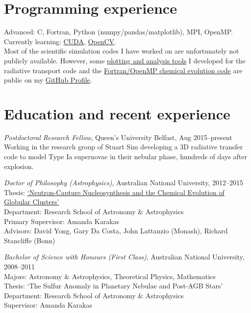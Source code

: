 \documentclass[11pt]{res} %
\begin{document}
\begin{resume}
\section{Programming experience}
  Advanced: C, Fortran, Python (numpy/pandas/matplotlib), MPI, OpenMP.\\
  Currently learning: \href{https://github.com/lukeshingles/cuda-examples}{CUDA}, \href{https://github.com/lukeshingles/opencv-examples}{OpenCV}.\\
  Most of the scientific simulation codes I have worked on are unfortunately not publicly available. However, some \href{https://github.com/lukeshingles/artistools}{plotting and analysis tools} I developed for the radiative transport code and the \href{https://github.com/lukeshingles/evelchemevol}{Fortran/OpenMP chemical evolution code} are public on my \href{https://github.com/lukeshingles}{GitHub Profile}.

\section{Education and recent experience}
  {\it Postdoctoral Research Fellow}, Queen's University Belfast, Aug 2015--present\\
  Working in the research group of Stuart Sim developing a 3D radiative transfer code to model Type Ia supernovae in their nebular phase, hundreds of days after explosion.

  {\it Doctor of Philosophy (Astrophysics)}, Australian National University, 2012--2015\\
  Thesis: \href{https://openresearch-repository.anu.edu.au/handle/1885/16507}{`Neutron-Capture Nucleosynthesis and the Chemical Evolution of Globular Clusters'}\\
  Department: Research School of Astronomy \& Astrophysics\\
  Primary Supervisor: Amanda Karakas\\
  Advisors: David Yong, Gary Da Costa, John Lattanzio (Monash), Richard Stancliffe (Bonn)

  {\it Bachelor of Science with Honours (First Class)}, Australian National University, 2008--2011\\
  Majors: Astronomy \& Astrophysics, Theoretical Physics, Mathematics\\
  Thesis: `The Sulfur Anomaly in Planetary Nebulae and Post-AGB Stars'\\
  Department: Research School of Astronomy \& Astrophysics\\
  Supervisor: Amanda Karakas


\end{resume}
\end{document}
